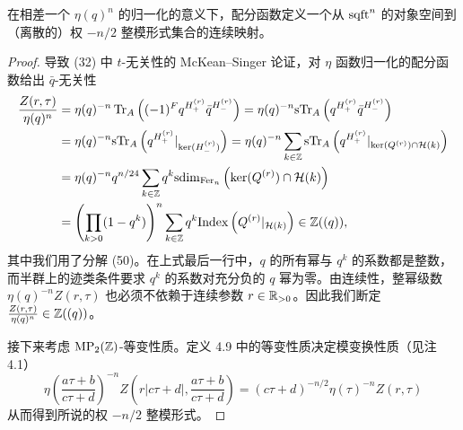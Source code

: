 \begin{theorem}[4.11（{[ST04, page 46]}）]
在相差一个 $\eta(q)^n$ 的归一化的意义下，配分函数定义一个从 $\operatorname{sqft}^n$ 的对象空间到（离散的）权 $-n/2$ 整模形式集合的连续映射。
\end{theorem}


\begin{proof}
导致 (32) 中 $t$-无关性的 McKean--Singer 论证，对 $\eta$ 函数归一化的配分函数给出 $\bar q$-无关性
\begin{align*}
\frac{Z(r,\tau)}{\eta(q)^n}&=\eta(q)^{-n}\operatorname{Tr}_A\left((-1)^Fq^{H^{(r)}_+}\bar q^{H^{(r)}_-}\right)=\eta(q)^{-n}\mathrm{sTr}_A\left(q^{H^{(r)}_+}\bar q^{H^{(r)}_-}\right)\\
&=\eta(q)^{-n}\mathrm{sTr}_A\left(q^{H^{(r)}_+}|_{\ker(H^{(r)}_-)}\right)=\eta(q)^{-n}\sum_{k\in\mathbb{Z}}\mathrm{sTr}_A\left(q^{H^{(r)}_+}|_{\ker(Q^{(r)})\cap\mathcal{H}(k)}\right)\\
&=\eta(q)^{-n}q^{n/24}\sum_{k\in\mathbb{Z}}q^k\mathrm{sdim}_{\mathrm{Fer}_n}\left(\ker(Q^{(r)})\cap\mathcal{H}(k)\right)\\
&=\left(\prod_{k>0}(1-q^k)\right)^{n}\sum_{k\in\mathbb{Z}}q^k\mathrm{Index}\left(Q^{(r)}|_{\mathcal{H}(k)}\right)\in\mathbb{Z}((q)),
\end{align*}
其中我们用了分解 (50)。在上式最后一行中，$q$ 的所有幂与 $q^k$ 的系数都是整数，而半群上的迹类条件要求 $q^k$ 的系数对充分负的 $q$ 幂为零。由连续性，整幂级数 $\eta(q)^{-n}Z(r,\tau)$ 也必须不依赖于连续参数 $r\in\mathbb{R}_{>0}$。因此我们断定 $\frac{Z(r,\tau)}{\eta(q)^n}\in\mathbb{Z}((q))$。

接下来考虑 $\operatorname{MP}_2(\mathbb{Z})$-等变性质。定义 4.9 中的等变性质决定模变换性质（见注 4.1）
\[
\eta\left(\frac{a\tau+b}{c\tau+d}\right)^{-n}Z\left(r|c\tau+d|,\frac{a\tau+b}{c\tau+d}\right)=(c\tau+d)^{-n/2}\eta(\tau)^{-n}Z(r,\tau)
\]
从而得到所说的权 $-n/2$ 整模形式。
\end{proof}


